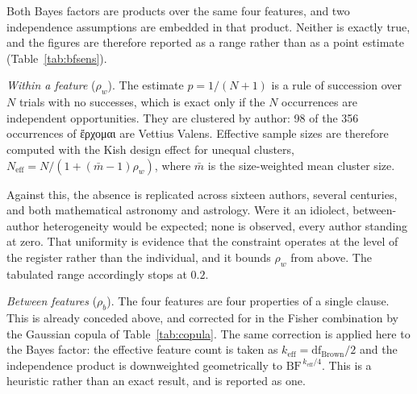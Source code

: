 \documentclass[11pt,a4paper]{article}
\newcommand{\grk}[1]{{\fontencoding{LGR}\selectfont #1}}
\newcommand{\grk}[1]{{\greekfont #1}}
\begin{document}
Both Bayes factors are products over the same four features, and two
independence assumptions are embedded in that product. Neither is exactly
true, and the figures are therefore reported as a range rather than as a point
estimate (Table~\ref{tab:bfsens}).

\emph{Within a feature} ($\rho_w$). The estimate $p = 1/(N+1)$ is a rule of
succession over $N$ trials with no successes, which is exact only if the $N$
occurrences are independent opportunities. They are clustered by author: 98 of
the 356 occurrences of \grk{ἔρχομαι} are Vettius Valens. Effective sample sizes
are therefore computed with the Kish design effect for unequal clusters,
$N_\mathrm{eff} = N / \left(1 + (\bar m - 1)\rho_w\right)$, where $\bar m$ is
the size-weighted mean cluster size.

Against this, the absence is replicated across sixteen authors, several
centuries, and both mathematical astronomy and astrology. Were it an idiolect,
between-author heterogeneity would be expected; none is observed, every author
standing at zero. That uniformity is evidence that the constraint operates at
the level of the register rather than the individual, and it bounds $\rho_w$
from above. The tabulated range accordingly stops at $0.2$.

\emph{Between features} ($\rho_b$). The four features are four properties of a
single clause. This is already conceded above, and corrected for in the Fisher
combination by the Gaussian copula of Table~\ref{tab:copula}. The same
correction is applied here to the Bayes factor: the effective feature count is
taken as $k_\mathrm{eff} = \mathrm{df}_\mathrm{Brown}/2$ and the
independence product is downweighted geometrically to
$\mathrm{BF}^{\,k_\mathrm{eff}/4}$. This is a heuristic rather than an exact
result, and is reported as one.
\end{document}

